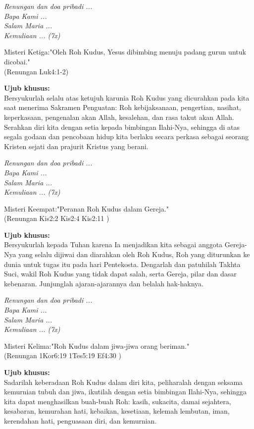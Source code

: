 \documentclass[a5paper,titlepage,11pt]{book}
\begin{document}
{\it Renungan dan doa pribadi ...\\
Bapa Kami ...\\
Salam Maria ...\\
Kemuliaan ... (7x)}

Misteri Ketiga:"Oleh Roh Kudus, Yesus dibimbing menuju padang gurun untuk dicobai."\\
(Renungan Luk4:1-2)

{\bf Ujub khusus:}\\
Bersyukurlah selalu atas ketujuh karunia Roh Kudus yang dicurahkan pada kita saat menerima Sakramen Penguatan: Roh kebijaksanaan, pengertian, nasihat, keperkasaan, pengenalan akan Allah, kesalehan, dan rasa takut akan Allah. Serahkan diri kita dengan setia kepada bimbingan Ilahi-Nya, sehingga di atas segala godaan dan pencobaan hidup kita berlaku secara perkasa sebagai seorang Kristen sejati dan prajurit Kristus yang berani.

{\it Renungan dan doa pribadi ...\\
Bapa Kami ...\\
Salam Maria ...\\
Kemuliaan ... (7x)}

Misteri Keempat:"Peranan Roh Kudus dalam Gereja."\\
(Renungan Kis2:2 Kis2:4 Kis2:11 )

{\bf Ujub khusus:}\\
Bersyukurlah kepada Tuhan karena Ia menjadikan kita sebagai anggota Gereja-Nya yang selalu dijiwai dan diarahkan oleh Roh Kudus, Roh yang diturunkan ke dunia untuk tugas itu pada hari Pentekosta. Dengarlah dan patuhilah Takhta Suci, wakil Roh Kudus yang tidak dapat salah, serta Gereja, pilar dan dasar kebenaran. Junjunglah ajaran-ajarannya dan belalah hak-haknya.

{\it Renungan dan doa pribadi ...\\
Bapa Kami ...\\
Salam Maria ...\\
Kemuliaan ... (7x)}

Misteri Kelima:"Roh Kudus dalam jiwa-jiwa orang beriman."\\
(Renungan 1Kor6:19 1Tes5:19 Ef4:30 )

{\bf Ujub khusus:}\\
Sadarilah keberadaan Roh Kudus dalam diri kita, peliharalah dengan seksama kemurnian tubuh dan jiwa, ikutilah dengan setia bimbingan Ilahi-Nya, sehingga kita dapat menghasilkan buah-buah Roh: kasih, sukacita, damai sejahtera, kesabaran, kemurahan hati, kebaikan, kesetiaan, kelemah lembutan, iman, kerendahan hati, penguasaan diri, dan kemurnian.
\end{document}
